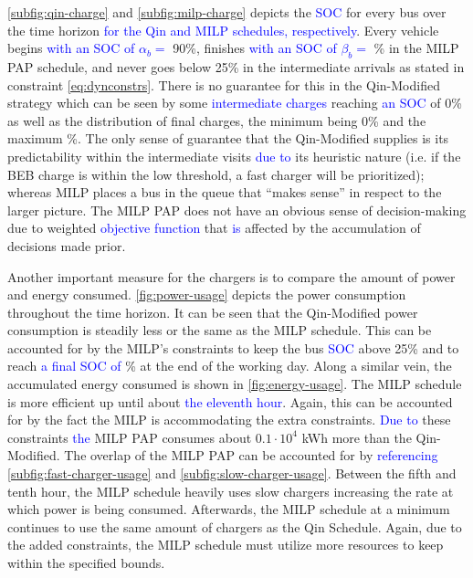 \documentclass[utf8]{FrontiersinHarvard}
\newcommand{\bcharge}{0.7 }                                                     %
\newcommand{\mincharge}{25\% }                                                  %
\newcommand{\batsize}{388 }                                                     %
\begin{document}
\autoref{subfig:qin-charge} and \autoref{subfig:milp-charge} depicts the \textcolor{blue}{SOC} for every bus
over the time horizon \textcolor{blue}{for the Qin and MILP schedules, respectively}. Every vehicle begins
\textcolor{blue}{with an SOC of $\alpha_b = $} 90\%, finishes \textcolor{blue}{with an SOC of $\beta_b =$}
\fpeval{\bcharge *100}\% in the MILP PAP schedule, and never goes below \mincharge in the intermediate arrivals as stated
in constraint \autoref{eq:dynconstrs}. There is no guarantee for this in the Qin-Modified strategy which can be seen by
some \textcolor{blue}{intermediate charges} reaching \textcolor{blue}{an SOC} of 0\% as well as the
distribution of final charges, the minimum being 0\% and the maximum \fpeval{trunc(\fpeval{368 / \batsize * 100}, 3)}\%. The only sense of guarantee that the Qin-Modified supplies is its predictability within the intermediate
visits \textcolor{blue}{due to} its heuristic nature (i.e. if the BEB charge is within the low threshold, a
fast charger will be prioritized); whereas MILP places a bus in the queue that ``makes sense'' in respect to the larger
picture. The MILP PAP does not have an obvious sense of decision-making due to weighted
\textcolor{blue}{objective function} that \textcolor{blue}{is} affected by the accumulation of
decisions made prior.

Another important measure for the chargers is to compare the amount of power and energy consumed.
\autoref{fig:power-usage} depicts the power consumption throughout the time horizon. It can be seen that the
Qin-Modified power consumption is steadily less or the same as the MILP schedule. This can be accounted for by the
MILP's constraints to keep the bus \textcolor{blue}{SOC} above \mincharge and to reach
\textcolor{blue}{a final SOC of} \fpeval{\bcharge *100}\% at the end of the working day. Along a similar vein,
the accumulated energy consumed is shown in \autoref{fig:energy-usage}. The MILP schedule is more efficient up until
about \textcolor{blue}{the eleventh hour}. Again, this can be accounted for by the fact the MILP is
accommodating the extra constraints. \textcolor{blue}{Due to} these constraints
\textcolor{blue}{the} MILP PAP consumes about \(0.1\cdot10^4\) kWh more than the Qin-Modified. The overlap of the
MILP PAP can be accounted for by \textcolor{blue}{referencing} \autoref{subfig:fast-charger-usage} and
\autoref{subfig:slow-charger-usage}. Between the fifth and tenth hour, the MILP schedule heavily uses slow chargers
increasing the rate at which power is being consumed. Afterwards, the MILP schedule at a minimum continues to use the
same amount of chargers as the Qin Schedule. Again, due to the added constraints, the MILP schedule must utilize more
resources to keep within the specified bounds.
\end{document}
